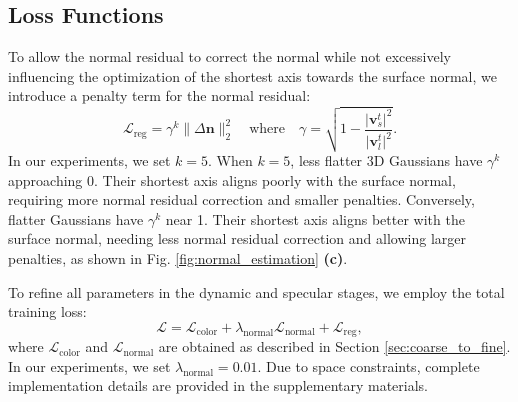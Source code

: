 \subsection{Loss Functions} \label{sec:losses}
To allow the normal residual to correct the normal while not excessively influencing the optimization of the shortest axis towards the surface normal, we introduce a penalty term for the normal residual:
\begin{equation}
\mathcal{L}_{\text{reg}} = \gamma^k\| \Delta \mathbf{n} \|_2^2
\quad
\text{where}
\quad
\gamma=\sqrt{1 - \frac{\lvert\mathbf{v}_s^t\rvert^2}{\lvert\mathbf{v}_l^t\rvert^2}}.
\end{equation}
In our experiments, we set $k = 5$. When $k=5$, less flatter 3D Gaussians have $\gamma^k$ approaching 0. Their shortest axis aligns poorly with the surface normal, requiring more normal residual correction and smaller penalties. Conversely, flatter Gaussians have $\gamma^k$ near 1. Their shortest axis aligns better with the surface normal, needing less normal residual correction and allowing larger penalties, as shown in Fig. \ref{fig:normal_estimation} \textbf{(c)}.



\vspace{3pt}  
To refine all parameters in the dynamic and specular stages, we employ the total training loss:
\begin{equation}
\mathcal{L}=  \mathcal{L}_{\text{color}} + \lambda_{\text{normal}}\mathcal{L}_{\text{normal}} + \mathcal{L}_{\text{reg}},
\end{equation}
where $\mathcal{L}_{\text{color}}$ and $\mathcal{L}_{\text{normal}}$ are obtained as described in Section \ref{sec:coarse_to_fine}. 
In our experiments, we set $\lambda_{\text{normal}} = 0.01$. Due to space constraints, complete implementation details are provided in the supplementary materials.
